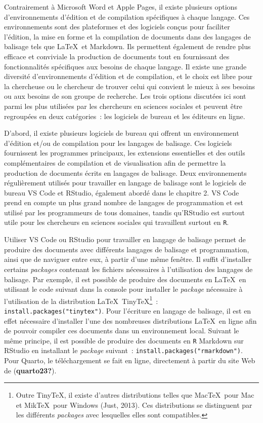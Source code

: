 \documentclass[
  letterpaper,
  DIV=11,
  numbers=noendperiod]{scrreprt}
\begin{document}
Contrairement à Microsoft Word et Apple Pages, il existe plusieurs
options d'environnements d'édition et de compilation spécifiques à
chaque langage. Ces environnements sont des plateformes et des logiciels
conçus pour faciliter l'édition, la mise en forme et la compilation de
documents dans des langages de balisage tels que \LaTeX~et Markdown. Ils
permettent également de rendre plus efficace et conviviale la production
de documents tout en fournissant des fonctionnalités spécifiques aux
besoins de chaque langage. Il existe une grande diversité
d'environnements d'édition et de compilation, et le choix est libre pour
la chercheuse ou le chercheur de trouver celui qui convient le mieux à
ses besoins ou aux besoins de son groupe de recherche. Les trois options
discutées ici sont parmi les plus utilisées par les chercheurs en
sciences sociales et peuvent être regroupées en deux catégories~: les
logiciels de bureau et les éditeurs en ligne.

D'abord, il existe plusieurs logiciels de bureau qui offrent un
environnement d'édition et/ou de compilation pour les langages de
balisage. Ces logiciels fournissent les programmes principaux, les
extensions essentielles et des outils complémentaires de compilation et
de visualisation afin de permettre la production de documents écrits en
langages de balisage. Deux environnements régulièrement utilisés pour
travailler en langage de balisage sont le logiciels de bureau VS Code et
RStudio, également abordé dans le chapitre 2. VS Code prend en compte un
plus grand nombre de langages de programmation et est utilisé par les
programmeurs de tous domaines, tandis qu'RStudio est surtout utile pour
les chercheurs en sciences sociales qui travaillent surtout en
\texttt{R}.

Utiliser VS Code ou RStudio pour travailler en langage de balisage
permet de produire des documents avec différents langages de balisage et
programmation, ainsi que de naviguer entre eux, à partir d'une même
fenêtre. Il suffit d'installer certains \emph{packages} contenant les
fichiers nécessaires à l'utilisation des langages de balisage. Par
exemple, il est possible de produire des documents en \LaTeX~en
utilisant le code suivant dans la console pour installer le
\emph{package} nécessaire à l'utilisation de la distribution
\LaTeX~Tiny\TeX\footnote{Outre Tiny\TeX, il existe d'autres
  distributions telles que Mac\TeX~pour Mac et Mik\TeX~pour Windows
  (Just, 2013). Ces distributions se distinguent par les différents
  \emph{packages} avec lesquelles elles sont compatibles.}~:
\texttt{install.packages("tinytex")}. Pour l'écriture en langage de
balisage, il est en effet nécessaire d'installer l'une des nombreuses
distributions \LaTeX~en ligne afin de pouvoir compiler ces documents
dans un environnement local. Suivant le même principe, il est possible
de produire des documents en \texttt{R} Markdown sur RStudio en
installant le \emph{package} suivant~:
\texttt{install.packages("rmarkdown")}. Pour Quarto, le téléchargement
se fait en ligne, directement à partir du site Web de
(\textbf{quarto23?}).
\end{document}
